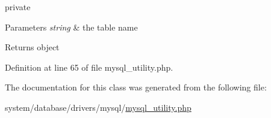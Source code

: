private 
\begin{DoxyParams}{Parameters}
{\em string} & the table name \\
\hline
\end{DoxyParams}
\begin{DoxyReturn}{Returns}
object 
\end{DoxyReturn}


Definition at line 65 of file mysql\-\_\-utility.\-php.



The documentation for this class was generated from the following file\-:\begin{DoxyCompactItemize}
\item 
system/database/drivers/mysql/\hyperlink{mysql__utility_8php}{mysql\-\_\-utility.\-php}\end{DoxyCompactItemize}
